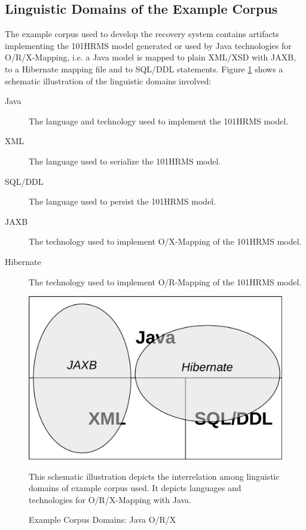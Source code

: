 \subsection{Linguistic Domains of the Example Corpus}
The example corpus used to develop the recovery system contains artifacts implementing the \gls{101HRMS} model generated or used by \gls{Java} technologies for \gls{O/R/X-Mapping}, i.e. a \gls{Java} model is mapped to plain \gls{XML}/\gls{XSD} with \gls{JAXB}, to a \gls{Hibernate} mapping file and to \gls{SQL}/\gls{DDL} statements.
Figure \ref{figure:ExampleCorpusJORXDomains} shows a schematic illustration of the linguistic domains involved:
\begin{description}

\item[Java]
The language and technology used to implement the \gls{101HRMS} model.

\item[XML]
The language used to serialize the \gls{101HRMS} model.

\item[SQL/DDL]
The language used to persist the \gls{101HRMS} model.

\item[JAXB]
The technology used to implement \gls{O/X-Mapping} of the \gls{101HRMS} model.

\item[Hibernate]
The technology used to implement \gls{O/R-Mapping} of the \gls{101HRMS} model.

\end{description}

\begin{figure}[h!]
\begin{center}
\includegraphics[scale=.4]{images/JORXDomains.png}
\end{center}
{
\scriptsize 
This schematic illustration depicts the interrelation among linguistic domains of example corpus used.
It depicts languages and technologies for \gls{O/R/X-Mapping} with \gls{Java}.
}
\caption{Example Corpus Domains: Java O/R/X}
\label{figure:ExampleCorpusJORXDomains}
\end{figure}

